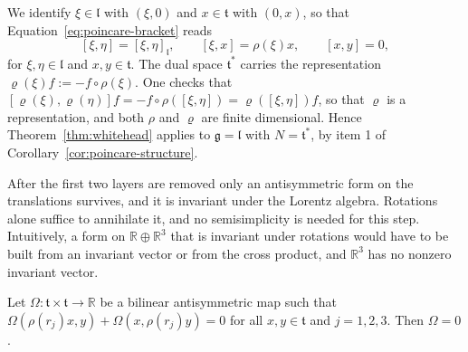 \begin{remark}\label{rem:lorentz-semisimple}
	We identify $\xi\in\mathfrak{l}$ with $(\xi,0)$ and $x\in\mathfrak{t}$ with $(0,x)$, so that Equation~\eqref{eq:poincare-bracket} reads
	\begin{equation}\label{eq:semidirect-brackets}
		[\xi,\eta]=[\xi,\eta]_{\mathfrak{l}},\qquad [\xi,x]=\rho(\xi)x,\qquad [x,y]=0,
	\end{equation}
	for $\xi,\eta\in\mathfrak{l}$ and $x,y\in\mathfrak{t}$. The dual space $\mathfrak{t}^*$ carries the representation $\varrho(\xi)f:=-f\circ\rho(\xi)$. One checks that $[\varrho(\xi),\varrho(\eta)]f=-f\circ\rho([\xi,\eta])=\varrho([\xi,\eta])f$, so that $\varrho$ is a representation, and both $\rho$ and $\varrho$ are finite dimensional. Hence Theorem~\ref{thm:whitehead} applies to $\mathfrak{g}=\mathfrak{l}$ with $N=\mathfrak{t}^*$, by item 1 of Corollary~\ref{cor:poincare-structure}.
\end{remark}

After the first two layers are removed only an antisymmetric form on the translations survives, and it is invariant under the Lorentz algebra. Rotations alone suffice to annihilate it, and no semisimplicity is needed for this step. Intuitively, a form on $\mathbb{R}\oplus\mathbb{R}^3$ that is invariant under rotations would have to be built from an invariant vector or from the cross product, and $\mathbb{R}^3$ has no nonzero invariant vector.

\begin{lemma}\label{lem:rotation-invariant}
	Let $\Omega:\mathfrak{t}\times\mathfrak{t}\to\mathbb{R}$ be a bilinear antisymmetric map such that $\Omega(\rho(r_j)x,y)+\Omega(x,\rho(r_j)y)=0$ for all $x,y\in\mathfrak{t}$ and $j=1,2,3$. Then $\Omega=0$.
\end{lemma}

